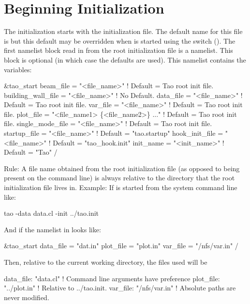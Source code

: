 \section{Beginning Initialization}
\label{s:init.begin} 

The initialization starts with the  \tao initialization file. The default name for this
file is  but this default may be overridden when \tao is started using the 
switch (). The first namelist block read in from the root initialization file is a
 namelist. This block is optional (in which case the defaults are used).  This
namelist contains the variables:
\begin{example}
  &tao_start
    beam_file          = "<file_name>"  ! Default = Tao root init file.
    building_wall_file = "<file_name>"  ! No Default.
    data_file          = "<file_name>"  ! Default = Tao root init file.
    var_file           = "<file_name>"  ! Default = Tao root init file.
    plot_file          = "<file_name1> \{<file_name2>\} ..."  
                                        ! Default = Tao root init file.
    single_mode_file   = "<file_name>"  ! Default = Tao root init file.
    startup_file       = "<file_name>"  ! Default = "tao.startup"
    hook_init_file     = "<file_name>"  ! Default = "tao_hook.init"
    init_name          = "<init_name>"  ! Default = "Tao"
  /
\end{example}
Rule: A file name obtained from the \tao root initialization file (as opposed to being present on
the command line) is always relative to the directory that the \tao root initialization file lives
in. Example: If \tao is started from the system command line like:
\begin{example}
    tao -data data.cl -init ../tao.init
\end{example}
And if the  namelist in  looks like:
\begin{example}
  &tao_start
    data_file = "dat.in"
    plot_file = "plot.in"
    var_file  = "/nfs/var.in"
  /
\end{example}
Then, relative to the current working directory, the files used will be
\begin{example}
  data_file: "data.cl"      ! Command line arguments have preference
  plot_file: "../plot.in"   ! Relative to ../tao.init.
  var_file:  "/nfs/var.in"  ! Absolute paths are never modified.
\end{example}


